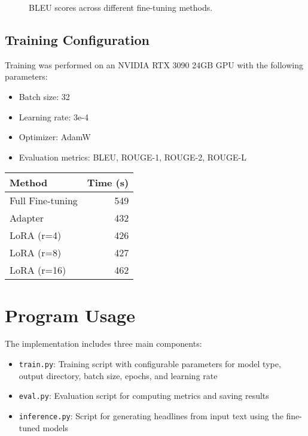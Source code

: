 \documentclass[conference]{IEEEtran}
\begin{document}
\begin{figure}[h]
\centering
{}
\caption{BLEU scores across different fine-tuning methods.}
\label{fig:bleu_scores}
\end{figure}

\subsection{Training Configuration}
Training was performed on an NVIDIA RTX 3090 24GB GPU with the following parameters:
\begin{itemize}
    \item Batch size: 32
    \item Learning rate: 3e-4
    \item Optimizer: AdamW
    \item Evaluation metrics: BLEU, ROUGE-1, ROUGE-2, ROUGE-L
\end{itemize}

\begin{table}[h]
\centering
\small
\setlength{\tabcolsep}{4pt}
\setlength{\belowcaptionskip}{-10pt}
\begin{tabular}{lr}
\toprule
Method & Time (s) \\
\midrule
Full Fine-tuning & 549 \\
Adapter & 432 \\
LoRA (r=4) & 426 \\
LoRA (r=8) & 427 \\
LoRA (r=16) & 462 \\
\bottomrule
\end{tabular}
\end{table}

\section{Program Usage}
The implementation includes three main components:
\begin{itemize}
    \item \texttt{train.py}: Training script with configurable parameters for model type, output directory, batch size, epochs, and learning rate
    \item \texttt{eval.py}: Evaluation script for computing metrics and saving results
    \item \texttt{inference.py}: Script for generating headlines from input text using the fine-tuned models
\end{itemize}
\end{document}
